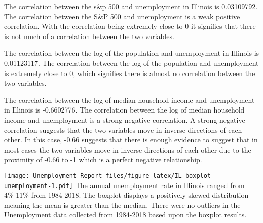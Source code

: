 \documentclass[
]{article}
\newenvironment{Shaded}{\begin{snugshade}}{\end{snugshade}}
\newcommand{\CommentTok}[1]{\textcolor[rgb]{0.56,0.35,0.01}{\textit{#1}}}
\newcommand{\DataTypeTok}[1]{\textcolor[rgb]{0.13,0.29,0.53}{#1}}
\newcommand{\DecValTok}[1]{\textcolor[rgb]{0.00,0.00,0.81}{#1}}
\newcommand{\KeywordTok}[1]{\textcolor[rgb]{0.13,0.29,0.53}{\textbf{#1}}}
\newcommand{\NormalTok}[1]{#1}
\newcommand{\OperatorTok}[1]{\textcolor[rgb]{0.81,0.36,0.00}{\textbf{#1}}}
\newcommand{\StringTok}[1]{\textcolor[rgb]{0.31,0.60,0.02}{#1}}
\begin{document}
The correlation between the s\&p 500 and unemployment in Illinois is
0.03109792. The correlation between the S\&P 500 and unemployment is a
weak positive correlation. With the correlation being extremely close to
0 it signifies that there is not much of a correlation between the two
variables.

The correlation between the log of the population and unemployment in
Illinois is 0.01123117. The correlation between the log of the
population and unemployment is extremely close to 0, which signifies
there is almost no correlation between the two variables.

The correlation between the log of median household income and
unemployment in Illinois is -0.6602776. The correlation between the log
of median household income and unemployment is a strong negative
correlation. A strong negative correlation suggests that the two
variables move in inverse directions of each other. In this case, -0.66
suggests that there is enough evidence to suggest that in most cases the
two variables move in inverse directions of each other due to the
proximity of -0.66 to -1 which is a perfect negative relationship.

\begin{Shaded}
\end{Shaded}

\texttt{[image: Unemployment\_Report\_files/figure-latex/IL boxplot unemployment-1.pdf]}
The annual unemployment rate in Illinois ranged from 4\%-11\% from
1984-2018. The boxplot displays a positively skewed distribution meaning
the mean is greater than the median. There were no outliers in the
Unemployment data collected from 1984-2018 based upon the boxplot
results.

\begin{Shaded}
\end{Shaded}
\end{document}
